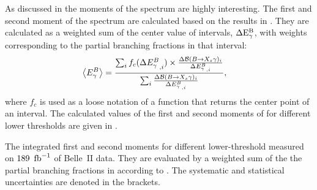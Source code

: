 As discussed in  the moments of the \BtoXsgamma
spectrum are highly interesting.
The first and second moment of the \BtoXsgamma spectrum are calculated based on the results in .
They are calculated as a weighted sum of the center value of \EB intervals, $\mathrm{\Delta{\ensuremath{E^B_{\gamma}}}}$,
with weights corresponding to the partial branching fractions in that \EB interval:
\begin{align}\label{eq:weighted_sum_moments}
    \begin{split}
        \expval{\EB} &= \frac{\sum_i f_c(\Delta\EB^{}_{,i})\times  
                               \frac{\Delta\mathcal{B}(\BtoXsgamma)_i}
                                    {\Delta {E^B_{\g}}_{,i}}}
                             {\sum_i \frac{\Delta\mathcal{B}(\BtoXsgamma)_i}{\Delta {E^B_{\g}}_{,i}}},
    \end{split}
\end{align} 
where $f_c$ is used as a loose notation of a function that returns the center point of an interval.
The calculated values of the first and second moments of \EB for different lower thresholds are given in .

\begin{table}[htbp!]
    \centering
    \caption{\label{tab:moments}
    The integrated \BtoXsgamma first and second moments for different lower-\EB threshold measured on $189~\mbox{\,fb}^{-1}$ of Belle~II data.
    They are evaluated by a weighted sum of the the partial branching fractions in  according to .
    The systematic and statistical uncertainties are denoted in the brackets.
    }
    
\end{table}
